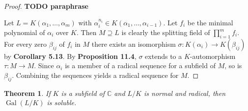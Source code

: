 \documentclass[12pt]{article}
\newtheorem{theorem}{Theorem}
\newcommand{\Gal}{\operatorname{Gal}}
\begin{document}
\begin{proof}
    \textbf{TODO paraphrase}

    Let $L=K\left(\alpha_1, \ldots, \alpha_m\right)$ with $\alpha_i^{n_i} \in
        K\left(\alpha_1, \ldots, \alpha_{i-1}\right)$. Let $f_i$ be the minimal
    polynomial of $\alpha_i$ over $K$. Then $M \supseteq L$ is clearly the
    splitting field of $\prod_{i=1}^m f_i$. For every zero $\beta_{i j}$ of
    $f_i$
    in $M$ there exists an isomorphism $\sigma : K\left(\alpha_i\right)
        \rightarrow
        K\left(\beta_{i j}\right)$ by \textbf{Corollary 5.13}. By
    \textbf{Proposition
        11.4}, $\sigma$ extends to a $K$-automorphism $\tau: M \rightarrow M$.
    Since
    $\alpha_i$ is a member of a radical sequence for a subfield of $M$, so is
    $\beta_{i j}$. Combining the sequences yields a radical sequence for $M$.
\end{proof}

\begin{theorem} \label{thm:radical-3}
    If $K$ is a subfield of $\mathbb{C}$ and $L / K$ is normal and radical,
    then
    $\Gal(L / K)$ is soluble.
\end{theorem}
\end{document}
